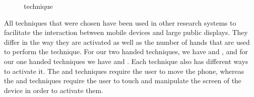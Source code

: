 \begin{figure}[H]
	\caption{\push \tilt technique}
	\label{fig:tiltTechnique}
\end{figure}

All techniques that were chosen have been used in other research systems to facilitate the interaction between mobile devices and large public displays.
They differ in the way they are activated as well as the number of hands that are used to perform the technique.
For our two handed techniques, we have \throw and \grab, and for our one handed techniques we have \tilt and \swipe. 
Each technique also has different ways to activate it. 
The \throw and \tilt techniques require the user to move the phone, whereas the \swipe and \grab techniques require the user to touch and manipulate the screen of the device in order to activate them. 


